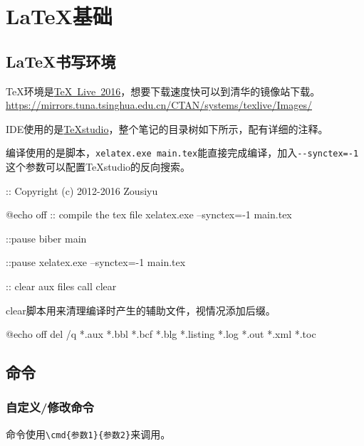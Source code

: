 \chapter{\LaTeX 基础}
\thispagestyle{chapterpage}

\section{\LaTeX 书写环境}

\TeX 环境是\href{http://tug.org/texlive/}{TeX~Live~2016}，想要下载速度快可以到清华的镜像站下载。\url{https://mirrors.tuna.tsinghua.edu.cn/CTAN/systems/texlive/Images/}

IDE使用的是\href{http://texstudio.sourceforge.net/}{TeXstudio}，整个笔记的目录树如下所示，配有详细的注释。


编译使用的是脚本，\lstinline|xelatex.exe main.tex|能直接完成编译，加入\lstinline|--synctex=-1|这个参数可以配置TeXstudio的反向搜索。

\begin{latex}
:: Copyright (c) 2012-2016 Zousiyu

@echo off
:: compile the tex file
xelatex.exe --synctex=-1 main.tex

::pause
biber main

::pause
xelatex.exe --synctex=-1 main.tex

:: clear aux files
call clear
\end{latex}

clear脚本用来清理编译时产生的辅助文件，视情况添加后缀。

\begin{latex}
@echo off
del /q *.aux *.bbl *.bcf *.blg *.listing *.log *.out *.xml *.toc
\end{latex}

\section{命令}
\subsection{自定义/修改命令}
命令使用\lstinline|\cmd{参数1}{参数2}|来调用。

